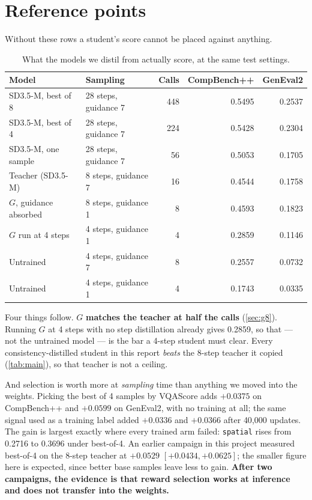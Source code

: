 \documentclass[11pt]{article}
\newcommand{\obs}[1]{\textcolor{obsblue}{#1}}
\begin{document}
\section{Reference points}
\label{sec:refs}

Without these rows a student's score cannot be placed against anything.

\begin{table}[h]
\centering
\caption{What the models we distil from actually score, at the same test settings.}
\label{tab:refs}
\small
\begin{tabular}{@{}llrrr@{}}
\toprule
Model & Sampling & Calls & CompBench++ & GenEval2 \\
\midrule
SD3.5-M, best of \obs{8} & \obs{28} steps, guidance \obs{7} & \obs{448} & \obs{0.5495} & \obs{0.2537} \\
SD3.5-M, best of \obs{4} & \obs{28} steps, guidance \obs{7} & \obs{224} & \obs{0.5428} & \obs{0.2304} \\
SD3.5-M, one sample & \obs{28} steps, guidance \obs{7} & \obs{56} & \obs{0.5053} & \obs{0.1705} \\
Teacher (SD3.5-M) & \obs{8} steps, guidance \obs{7} & \obs{16} & \obs{0.4544} & \obs{0.1758} \\
$G$, guidance absorbed & \obs{8} steps, guidance \obs{1} & \obs{8} & \obs{0.4593} & \obs{0.1823} \\
$G$ run at 4 steps & \obs{4} steps, guidance \obs{1} & \obs{4} & \obs{0.2859} & \obs{0.1146} \\
Untrained & \obs{4} steps, guidance \obs{7} & \obs{8} & \obs{0.2557} & \obs{0.0732} \\
Untrained & \obs{4} steps, guidance \obs{1} & \obs{4} & \obs{0.1743} & \obs{0.0335} \\
\bottomrule
\end{tabular}
\end{table}

Four things follow. $G$ \textbf{matches the teacher at half the calls} (\cref{sec:g8}). Running $G$
at \obs{4} steps with no step distillation already gives \obs{0.2859}, so that --- not the untrained
model --- is the bar a 4-step student must clear. Every consistency-distilled student in this report
\emph{beats} the \obs{8}-step teacher it copied (\cref{tab:main}), so that teacher is not a ceiling.

And selection is worth more at \emph{sampling} time than anything we moved into the weights. Picking
the best of \obs{4} samples by VQAScore adds \obs{$+0.0375$} on CompBench++ and \obs{$+0.0599$} on
GenEval2, with no training at all; the same signal used as a training label added \obs{$+0.0336$}
and \obs{$+0.0366$} after \obs{40{,}000} updates. The gain is largest exactly where every trained arm
failed: \texttt{spatial} rises from \obs{0.2716} to \obs{0.3696} under best-of-\obs{4}. An earlier
campaign in this project measured best-of-\obs{4} on the \obs{8}-step teacher at \obs{$+0.0529$}
$[+0.0434,+0.0625]$; the smaller figure here is expected, since better base samples leave less to
gain. \textbf{After two campaigns, the evidence is that reward selection works at inference and does
not transfer into the weights.}
\end{document}
